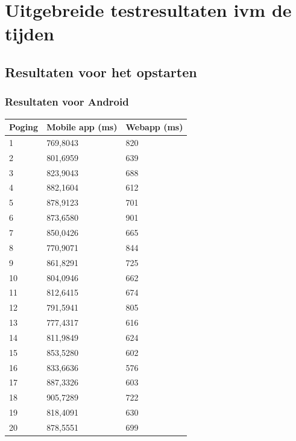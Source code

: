 \documentclass[pdftex,a4paper,12pt,twoside]{report}
\begin{document}
\tableofcontents

\appendix

\chapter{Uitgebreide testresultaten ivm de tijden}
\label{ch:uitgebereidresultatenmetbetrekkingtottijden}

\section{Resultaten voor het opstarten}
\subsection{Resultaten voor Android}
\begin{center}
    \begin{tabular}{ | l | l | l |}
    \hline
    Poging & Mobile app (ms) & Webapp (ms)
      \\ \hline
      1 & 769,8043 & 820
      \\ \hline
      2 & 801,6959 & 639
      \\ \hline
      3 & 823,9043 & 688
      \\ \hline
      4 & 882,1604 & 612
      \\ \hline
      5 & 878,9123 & 701
      \\ \hline
      6 & 873,6580 & 901
      \\ \hline
      7 & 850,0426 & 665
      \\ \hline
      8 & 770,9071 & 844
      \\ \hline
      9 & 861,8291 & 725
      \\ \hline
      10 & 804,0946 & 662
      \\ \hline
      11 & 812,6415 & 674
      \\ \hline
      12 & 791,5941 & 805
      \\ \hline
      13 & 777,4317 & 616
      \\ \hline
      14 & 811,9849 & 624
      \\ \hline
      15 & 853,5280 & 602
      \\ \hline
      16 & 833,6636 & 576
      \\ \hline
      17 & 887,3326 & 603
      \\ \hline
      18 & 905,7289 & 722
      \\ \hline
      19 & 818,4091 & 630
      \\ \hline
      20 & 878,5551 & 699
      \\ \hline
    \end{tabular}
\end{center}
\newpage
\end{document}

